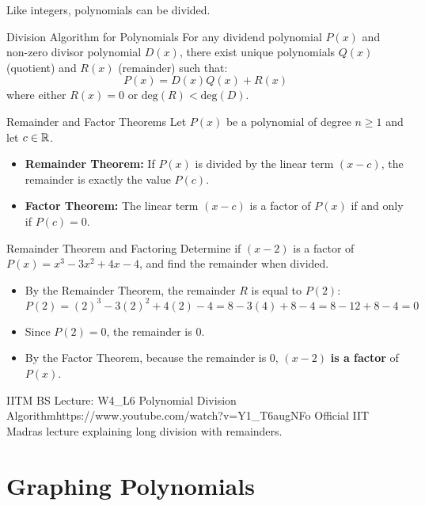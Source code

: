 Like integers, polynomials can be divided.

\begin{theorembox}{Division Algorithm for Polynomials}
For any dividend polynomial $P(x)$ and non-zero divisor polynomial $D(x)$, there exist unique polynomials $Q(x)$ (quotient) and $R(x)$ (remainder) such that:
$$P(x) = D(x)Q(x) + R(x)$$
where either $R(x) = 0$ or $\text{deg}(R) < \text{deg}(D)$.
\end{theorembox}

\begin{theorembox}{Remainder and Factor Theorems}
Let $P(x)$ be a polynomial of degree $n \ge 1$ and let $c \in \mathbb{R}$.
\begin{itemize}
    \item \textbf{Remainder Theorem:} If $P(x)$ is divided by the linear term $(x - c)$, the remainder is exactly the value $P(c)$.
    \item \textbf{Factor Theorem:} The linear term $(x - c)$ is a factor of $P(x)$ if and only if $P(c) = 0$.
\end{itemize}
\end{theorembox}

\begin{examplebox}{Remainder Theorem and Factoring}
Determine if $(x - 2)$ is a factor of $P(x) = x^3 - 3x^2 + 4x - 4$, and find the remainder when divided.
\begin{itemize}
    \item By the Remainder Theorem, the remainder $R$ is equal to $P(2)$:
    $$P(2) = (2)^3 - 3(2)^2 + 4(2) - 4 = 8 - 3(4) + 8 - 4 = 8 - 12 + 8 - 4 = 0$$
    \item Since $P(2) = 0$, the remainder is $0$.
    \item By the Factor Theorem, because the remainder is $0$, $(x - 2)$ \textbf{is a factor} of $P(x)$.
\end{itemize}
\end{examplebox}

\begin{videocard}{IITM BS Lecture: W4\_L6 Polynomial Division Algorithm}{https://www.youtube.com/watch?v=Y1_T6augNFo}
Official IIT Madras lecture explaining long division with remainders.
\end{videocard}

\section{Graphing Polynomials}

